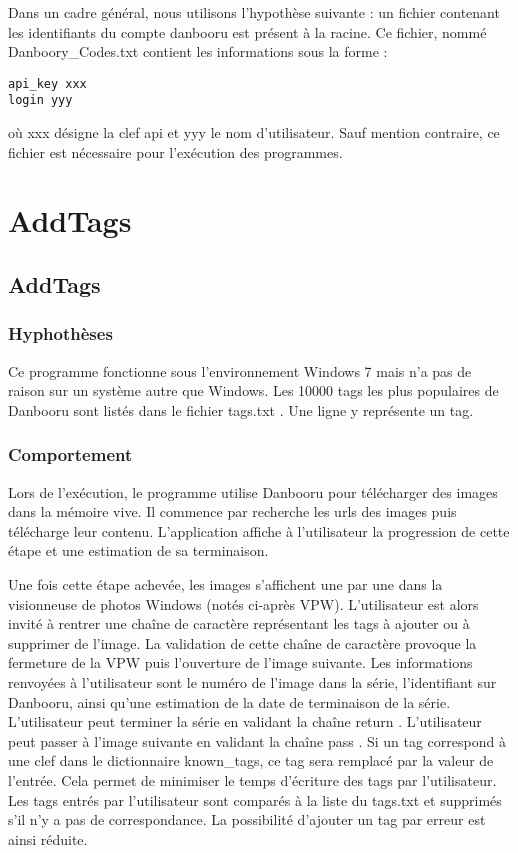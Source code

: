 \documentclass[a4paper,12pt]{article}
\begin{document}
Dans un cadre général, nous utilisons l'hypothèse suivante : un fichier contenant les identifiants du compte danbooru est présent à la racine. Ce fichier, nommé Danboory\_Codes.txt contient les informations sous la forme :
\begin{lstlisting}
api_key xxx
login yyy
\end{lstlisting}

où \og xxx \fg{} désigne la clef api et \og yyy \fg{} le nom d'utilisateur.
Sauf mention contraire, ce fichier est nécessaire pour l'exécution des programmes.   
\section{AddTags}
\subsection{AddTags}
\subsubsection{Hyphothèses}
Ce programme fonctionne sous l'environnement Windows 7 mais n'a pas de raison sur un système autre que Windows.
Les 10000 tags les plus populaires de Danbooru sont listés dans le fichier \og tags.txt \fg. Une ligne y représente un tag.
\subsubsection{Comportement}
Lors de l'exécution, le programme utilise Danbooru pour télécharger des images dans la mémoire vive. Il commence par recherche les urls des images puis télécharge leur contenu. L'application affiche à l'utilisateur la progression de cette étape et une estimation de sa terminaison. 

Une fois cette étape achevée, les images s'affichent une par une dans la visionneuse de photos Windows (notés ci-après VPW). L'utilisateur est alors invité à rentrer une chaîne de caractère représentant les tags à ajouter ou à supprimer de l'image. La validation de cette chaîne de caractère provoque la fermeture de la VPW puis l'ouverture de l'image suivante. Les informations renvoyées à l'utilisateur sont le numéro de l'image dans la série, l'identifiant sur Danbooru, ainsi qu'une estimation de la date de terminaison de la série. L'utilisateur peut terminer la série en validant la chaîne \og return \fg{}. L'utilisateur peut passer à l'image suivante en validant la chaîne \og pass \fg{}. Si un tag correspond à une clef dans le dictionnaire known\_tags, ce tag sera remplacé par la valeur de l'entrée. Cela permet de minimiser le temps d'écriture des tags par l'utilisateur. 
Les tags entrés par l'utilisateur sont comparés à la liste du \og tags.txt \fg{} et supprimés s'il n'y a pas de correspondance. La possibilité d'ajouter un tag par erreur est ainsi réduite. 
\end{document}
